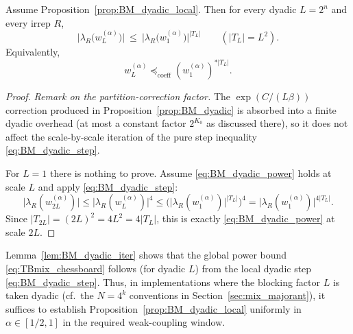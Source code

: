 \begin{lemma}\label{lem:BM_dyadic_iter}
Assume Proposition~\ref{prop:BM_dyadic_local}. Then for every dyadic $L=2^n$ and every irrep $R$,
\begin{equation}\label{eq:BM_dyadic_power}
\big|\lambda_R\!\bigl(w_{L}^{(\alpha)}\bigr)\big|
\ \le\
\big|\lambda_R\!\bigl(w_{1}^{(\alpha)}\bigr)\big|^{|T_L|}
\qquad(|T_L|=L^2).
\end{equation}
\noindent Equivalently,
\[
w_L^{(\alpha)} \preceq_{\mathrm{coeff}} (w_1^{(\alpha)})^{*|T_L|}.
\]
\end{lemma}
\begin{proof}
\noindent\emph{Remark on the partition-correction factor.} The $\exp(C/(L\beta))$ correction produced in Proposition~\ref{prop:BM_dyadic} is absorbed into a finite dyadic overhead (at most a constant factor $2^{K_0}$ as discussed there), so it does not affect the scale-by-scale iteration of the pure step inequality \eqref{eq:BM_dyadic_step}.

For $L=1$ there is nothing to prove.
Assume \eqref{eq:BM_dyadic_power} holds at scale $L$ and apply \eqref{eq:BM_dyadic_step}:
\[
\big|\lambda_R(w_{2L}^{(\alpha)})\big|
\le \big|\lambda_R(w_{L}^{(\alpha)})\big|^{4}
\le \Big(\big|\lambda_R(w_{1}^{(\alpha)})\big|^{|T_L|}\Big)^{4}
= \big|\lambda_R(w_{1}^{(\alpha)})\big|^{4|T_L|}.
\]
Since $|T_{2L}|=(2L)^2=4L^2=4|T_L|$, this is exactly \eqref{eq:BM_dyadic_power} at scale $2L$.
\end{proof}

\begin{remark}\label{rem:BM_to_chessboard}
Lemma~\ref{lem:BM_dyadic_iter} shows that the global power bound \eqref{eq:TBmix_chessboard} follows (for dyadic $L$) from the local
dyadic step \eqref{eq:BM_dyadic_step}.
Thus, in implementations where the blocking factor $L$ is taken dyadic (cf.\ the $N=4^k$ conventions in Section~\ref{sec:mix_majorant}),
it suffices to establish Proposition~\ref{prop:BM_dyadic_local} uniformly in $\alpha\in[1/2,1]$ in the required weak-coupling window.
\end{remark}

